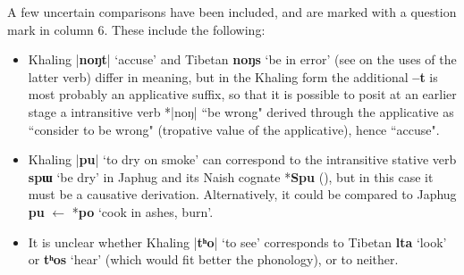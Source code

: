\documentclass[oldfontcommands,oneside,a4paper,11pt]{article}
\newcommand{\ipa}[1]{{\phon\textbf{#1}}}
\newcommand{\forme}[2]{\ipa{#1} `#2'}
\newcommand{\dhatu}[2]{|\ipa{#1}| `#2'}
\begin{document}
A few uncertain comparisons have been included, and are marked with a question mark in column 6. These include the following:

\begin{itemize}
\item Khaling \dhatu{noŋt}{accuse} and Tibetan \forme{noŋs}{be in error} (see \citealt{hill08moriendi} on the uses of the latter verb) differ in meaning, but in the Khaling form the additional \ipa{--t} is most probably an applicative suffix, so that it is possible to posit at an earlier stage a intransitive verb *|noŋ| ``be wrong" derived through the applicative as ``consider to be wrong" (tropative value of the applicative), hence ``accuse".
\item Khaling \dhatu{pu}{to dry on smoke} can correspond to the intransitive stative verb \forme{spɯ}{be dry} in Japhug and its Naish cognate *\ipa{Spu} (\citealt{jacques.michaud11naish}), but in this case it must be a causative derivation. 
Alternatively, it could be compared to Japhug \ipa{pu} $\leftarrow$ *\ipa{po}  `cook in ashes, burn'.
\item It is unclear whether Khaling \dhatu{tʰo}{to see} corresponds to Tibetan \forme{lta}{look} or \forme{tʰos}{hear} (which would fit better the phonology), or to neither.
\end{itemize}
\end{document}
